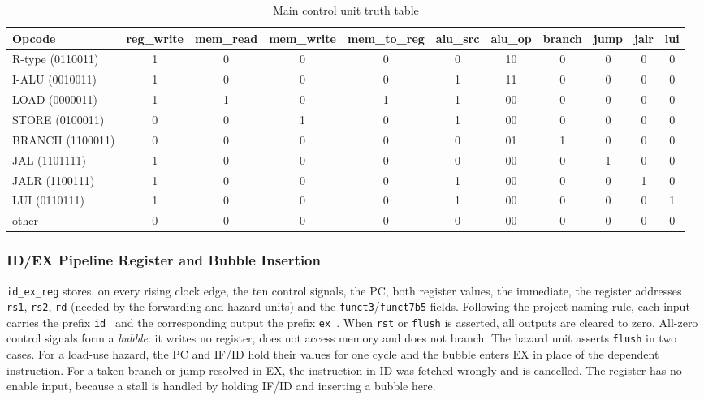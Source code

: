 \begin{table}[!t]
\centering
\caption{Main control unit truth table}
\label{tab:control}
\begin{tabular}{|l|c|c|c|c|c|c|c|c|c|c|}
\hline
\textbf{Opcode} & \textbf{reg\_write} & \textbf{mem\_read} & \textbf{mem\_write} &
\textbf{mem\_to\_reg} & \textbf{alu\_src} & \textbf{alu\_op} & \textbf{branch} &
\textbf{jump} & \textbf{jalr} & \textbf{lui} \\
\hline
R-type (0110011) & 1 & 0 & 0 & 0 & 0 & 10 & 0 & 0 & 0 & 0 \\
I-ALU (0010011)  & 1 & 0 & 0 & 0 & 1 & 11 & 0 & 0 & 0 & 0 \\
LOAD (0000011)   & 1 & 1 & 0 & 1 & 1 & 00 & 0 & 0 & 0 & 0 \\
STORE (0100011)  & 0 & 0 & 1 & 0 & 1 & 00 & 0 & 0 & 0 & 0 \\
BRANCH (1100011) & 0 & 0 & 0 & 0 & 0 & 01 & 1 & 0 & 0 & 0 \\
JAL (1101111)    & 1 & 0 & 0 & 0 & 0 & 00 & 0 & 1 & 0 & 0 \\
JALR (1100111)   & 1 & 0 & 0 & 0 & 1 & 00 & 0 & 0 & 1 & 0 \\
LUI (0110111)    & 1 & 0 & 0 & 0 & 1 & 00 & 0 & 0 & 0 & 1 \\
other            & 0 & 0 & 0 & 0 & 0 & 00 & 0 & 0 & 0 & 0 \\
\hline
\end{tabular}
\end{table}

\subsubsection{ID/EX Pipeline Register and Bubble Insertion}
\texttt{id\_ex\_reg} stores, on every rising clock edge, the ten control
signals, the PC, both register values, the immediate, the register addresses
\texttt{rs1}, \texttt{rs2}, \texttt{rd} (needed by the forwarding and hazard
units) and the \texttt{funct3}/\texttt{funct7b5} fields. Following the
project naming rule, each input carries the prefix \texttt{id\_} and the
corresponding output the prefix \texttt{ex\_}. When \texttt{rst} or
\texttt{flush} is asserted, all outputs are cleared to zero. All-zero control
signals form a \emph{bubble}: it writes no register, does not access memory and
does not branch. The hazard unit asserts \texttt{flush} in two cases. For a
load-use hazard, the PC and IF/ID hold their values for one cycle and the bubble
enters EX in place of the dependent instruction. For a taken branch or jump
resolved in EX, the instruction in ID was fetched wrongly and is cancelled. The
register has no enable input, because a stall is handled by holding IF/ID and
inserting a bubble here.

